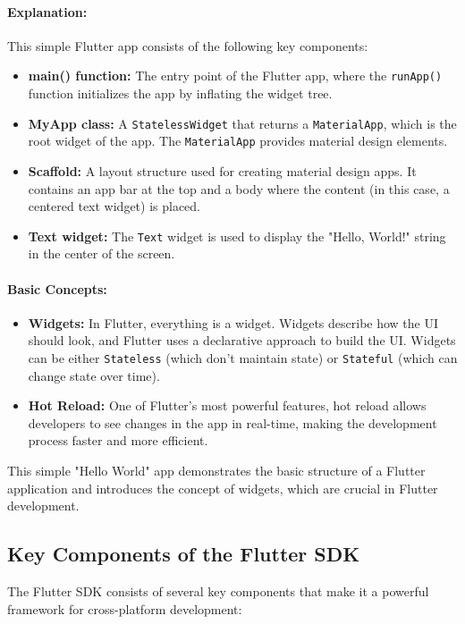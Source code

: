 \documentclass[12pt,a4paper]{report}
\begin{document}
\paragraph{Explanation:}
This simple Flutter app consists of the following key components:
\begin{itemize}
    \item \textbf{main() function:} The entry point of the Flutter app, where the \texttt{runApp()} function initializes the app by inflating the widget tree.
    \item \textbf{MyApp class:} A \texttt{StatelessWidget} that returns a \texttt{MaterialApp}, which is the root widget of the app. The \texttt{MaterialApp} provides material design elements.
    \item \textbf{Scaffold:} A layout structure used for creating material design apps. It contains an app bar at the top and a body where the content (in this case, a centered text widget) is placed.
    \item \textbf{Text widget:} The \texttt{Text} widget is used to display the "Hello, World!" string in the center of the screen.
\end{itemize}

\paragraph{Basic Concepts:}
\begin{itemize}
    \item \textbf{Widgets:} In Flutter, everything is a widget. Widgets describe how the UI should look, and Flutter uses a declarative approach to build the UI. Widgets can be either \texttt{Stateless} (which don’t maintain state) or \texttt{Stateful} (which can change state over time).
    \item \textbf{Hot Reload:} One of Flutter's most powerful features, hot reload allows developers to see changes in the app in real-time, making the development process faster and more efficient.
\end{itemize}

This simple "Hello World" app demonstrates the basic structure of a Flutter application and introduces the concept of widgets, which are crucial in Flutter development.


\subsection{Key Components of the Flutter SDK}
The Flutter SDK consists of several key components that make it a powerful framework for cross-platform development:
\end{document}

